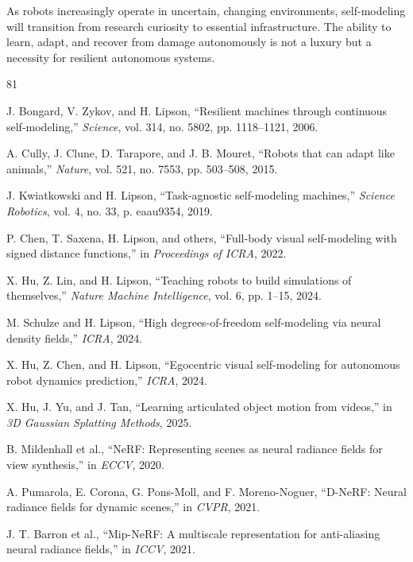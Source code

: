 \documentclass[journal]{IEEEtran}
\begin{document}
As robots increasingly operate in uncertain, changing environments, self-modeling will transition from research curiosity to essential infrastructure. The ability to learn, adapt, and recover from damage autonomously is not a luxury but a necessity for resilient autonomous systems.

\begin{thebibliography}{81}

 J. Bongard, V. Zykov, and H. Lipson, ``Resilient machines through continuous self-modeling,'' \textit{Science}, vol. 314, no. 5802, pp. 1118--1121, 2006.

 A. Cully, J. Clune, D. Tarapore, and J. B. Mouret, ``Robots that can adapt like animals,'' \textit{Nature}, vol. 521, no. 7553, pp. 503--508, 2015.

 J. Kwiatkowski and H. Lipson, ``Task-agnostic self-modeling machines,'' \textit{Science Robotics}, vol. 4, no. 33, p. eaau9354, 2019.

 P. Chen, T. Saxena, H. Lipson, and others, ``Full-body visual self-modeling with signed distance functions,'' in \textit{Proceedings of ICRA}, 2022.

 X. Hu, Z. Lin, and H. Lipson, ``Teaching robots to build simulations of themselves,'' \textit{Nature Machine Intelligence}, vol. 6, pp. 1--15, 2024.

 M. Schulze and H. Lipson, ``High degrees-of-freedom self-modeling via neural density fields,'' \textit{ICRA}, 2024.

 X. Hu, Z. Chen, and H. Lipson, ``Egocentric visual self-modeling for autonomous robot dynamics prediction,'' \textit{ICRA}, 2024.

 X. Hu, J. Yu, and J. Tan, ``Learning articulated object motion from videos,'' in \textit{3D Gaussian Splatting Methods}, 2025.

 B. Mildenhall et al., ``NeRF: Representing scenes as neural radiance fields for view synthesis,'' in \textit{ECCV}, 2020.

 A. Pumarola, E. Corona, G. Pons-Moll, and F. Moreno-Noguer, ``D-NeRF: Neural radiance fields for dynamic scenes,'' in \textit{CVPR}, 2021.

 J. T. Barron et al., ``Mip-NeRF: A multiscale representation for anti-aliasing neural radiance fields,'' in \textit{ICCV}, 2021.


\end{thebibliography}
\end{document}
